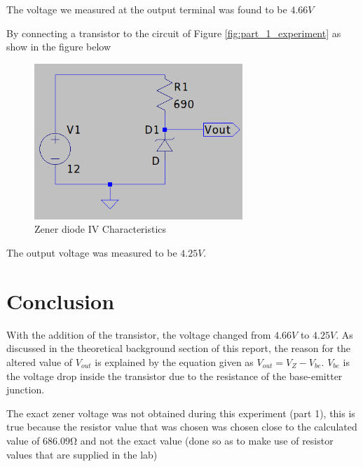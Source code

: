 \documentclass[12pt, a4paper]{article}
\begin{document}
		The voltage we measured at the output terminal was found to be $4.66V$

		By connecting a transistor to the circuit of Figure \ref{fig:part_1_experiment} as show in the figure below 

		\begin{figure}[H]
			\centering
			\includegraphics[width=0.7\textwidth]{Images/Part_2_Experiment.png}
			\caption{Zener diode IV Characteristics}
			\label{fig:part_2_experiment}
		\end{figure}

		The output voltage was measured to be $4.25V$. 
	

	\section{Conclusion} %
	\label{sec:conclusion}
		With the addition of the transistor, the voltage changed from $4.66V$ to $4.25V$. As discussed in the theoretical background section of this report, the reason for the altered value of $V_{out}$ is explained by the equation given as $V_{out} = V_Z - V_{be}$. $V_{be}$ is the voltage drop inside the transistor due to the resistance of the base-emitter junction.

		The exact zener voltage was not obtained during this experiment (part 1), this is true because the resistor value that was chosen was chosen close to the calculated value of $686.09 \si{\ohm}$ and not the exact value (done so as to make use of resistor values that are supplied in the lab)
	
\end{document}
